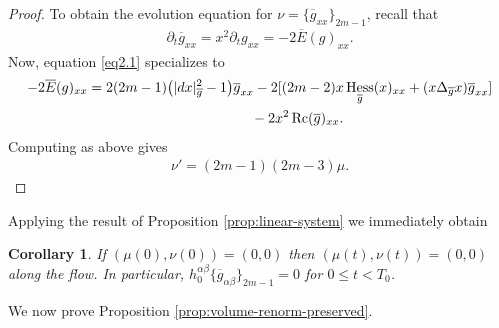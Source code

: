 \documentclass[11pt]{article}
\numberwithin{equation}{section}
\newtheorem{Corollary}[Theorem]{Corollary}
\newcommand{\olg}{\overline{g}}
\newcommand{\olE}{\overline{E}}
\newcommand{\gbar}{\overline{g}}
\DeclareMathOperator{\Rc}{Rc}
\DeclareMathOperator{\hess}{Hess}
\begin{document}
\begin{proof}
To obtain the evolution equation for $\nu = \{\olg_{xx}\}_{2m-1}$, recall that
\begin{gather*}%
\partial_t \olg_{xx} = x^2 \partial_t g_{xx} = - 2 \olE( g )_{xx}.
\end{gather*}
Now, equation \eqref{eq2.1} specializes to
\begin{gather*}%
-2\olE( g )_{xx} =2(2m-1) \big(|{\rm d}x|^2_{\gbar}-1\big) \olg_{xx} -2 [ (2m-2) x\hess_{\olg} (x)_{xx} +(x\Delta_{\olg} x) \olg_{xx} ]\\
\hphantom{-2\olE( g )_{xx} =}{} -2x^2 \Rc(\gbar)_{xx} .
\end{gather*}
Computing as above gives
\begin{gather*}%
\nu' = (2m-1)(2m-3) \mu.\tag*{\qed}
\end{gather*}\renewcommand{\qed}{}
\end{proof}

Applying the result of Proposition \ref{prop:linear-system} we immediately obtain
\begin{Corollary} \label{corollary3.4}
If $(\mu(0), \nu(0)) = (0,0)$ then $(\mu(t), \nu(t)) = (0,0)$ along the flow. In particular, $h_0^{\alpha \beta} \{\gbar_{\alpha \beta}\}_{2m-1} = 0$ for $0 \leq t < T_0$.
\end{Corollary}

We now prove Proposition \ref{prop:volume-renorm-preserved}.
\end{document}
